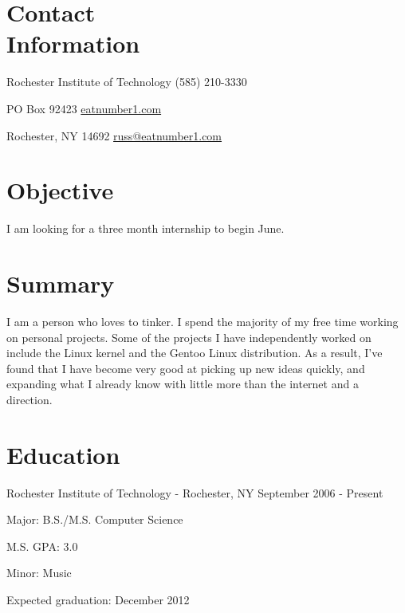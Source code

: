 \documentclass[a4paper,margin,line]{resume}
\newcommand{\rdate}[1]{\hfill {\small #1}}
\begin{document}
\begin{resume}
\section{\mysidestyle Contact \\ Information} \vspace{2mm}
	\begin{asparablank}
		\item Rochester Institute of Technology \hfill (585) 210-3330
		\item PO Box 92423 \hfill \href{http://eatnumber1.com/}{eatnumber1.com}
		\item Rochester, NY 14692 \hfill \href{mailto:russ@eatnumber1.com}{russ@eatnumber1.com}
	\end{asparablank}

\section{\mysidestyle Objective}
	I am looking for a three month internship to begin June.

\section{\mysidestyle Summary}
	I am a person who loves to tinker. I spend the majority of my free time working on personal projects. Some of the projects I have independently worked on include the Linux kernel and the Gentoo Linux distribution.  As a result, I've found that I have become very good at picking up new ideas quickly, and expanding what I already know with little more than the internet and a direction.

\section{\mysidestyle Education}
	\begin{compactdesc}
		\item[Rochester Institute of Technology] - Rochester, NY \rdate{September 2006 - Present}
		\begin{compactitem} { \small
			\item Major: B.S./M.S. Computer Science
			\item M.S. GPA: 3.0
			\item Minor: Music
			\item Expected graduation: December 2012
		} \end{compactitem}
	\end{compactdesc}


\end{resume}
\end{document}
